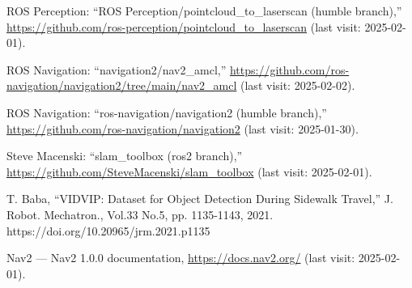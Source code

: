 \documentclass[twocolumn,9pt]{jsproceedings}
\begin{document}
\begin{thebibliography}{99}
  ROS Perception: ``ROS Perception/pointcloud\_to\_laserscan (humble branch),'' \url{https://github.com/ros-perception/pointcloud_to_laserscan} (last visit: 2025-02-01).

  
  ROS Navigation: ``navigation2/nav2\_amcl,'' \url{https://github.com/ros-navigation/navigation2/tree/main/nav2_amcl}  (last visit: 2025-02-02).

  ROS Navigation: ``ros-navigation/navigation2 (humble branch),'' \url{https://github.com/ros-navigation/navigation2} (last visit: 2025-01-30).

  Steve Macenski: ``slam\_toolbox (ros2 branch),'' \url{https://github.com/SteveMacenski/slam_toolbox} (last visit: 2025-02-01).





  
  T. Baba, “VIDVIP: Dataset for Object Detection During Sidewalk Travel,” J. Robot. Mechatron., Vol.33 No.5, pp. 1135-1143, 2021. https://doi.org/10.20965/jrm.2021.p1135
  
  Nav2 — Nav2 1.0.0 documentation, \url{https://docs.nav2.org/} (last visit: 2025-02-01).
\end{thebibliography}
\normalsize
\end{document}
